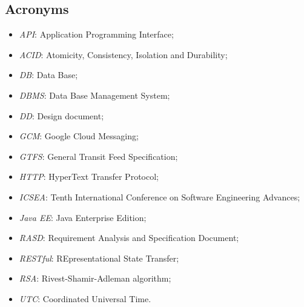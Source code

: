 \subsection{Acronyms}
	\begin{itemize}
	\item \textit{API}: Application Programming Interface;
	\item \textit{ACID}: Atomicity, Consistency, Isolation and Durability;
	\item \textit{DB}: Data Base;
	\item \textit{DBMS}: Data Base Management System;
	\item \textit{DD}: Design document;
	\item \textit{GCM}: Google Cloud Messaging;
	\item \textit{GTFS}: General Transit Feed Specification;
	\item \textit{HTTP}: HyperText Transfer Protocol;
	\item \textit{ICSEA}: Tenth International Conference on Software Engineering Advances;
	\item \textit{Java EE}: Java Enterprise Edition;
	\item \textit{RASD}: Requirement Analysis and Specification Document;
	\item \textit{RESTful}: REpresentational State Transfer;
	\item \textit{RSA}: Rivest-Shamir-Adleman algorithm;
	\item \textit{UTC}: Coordinated Universal Time.
	\end{itemize}